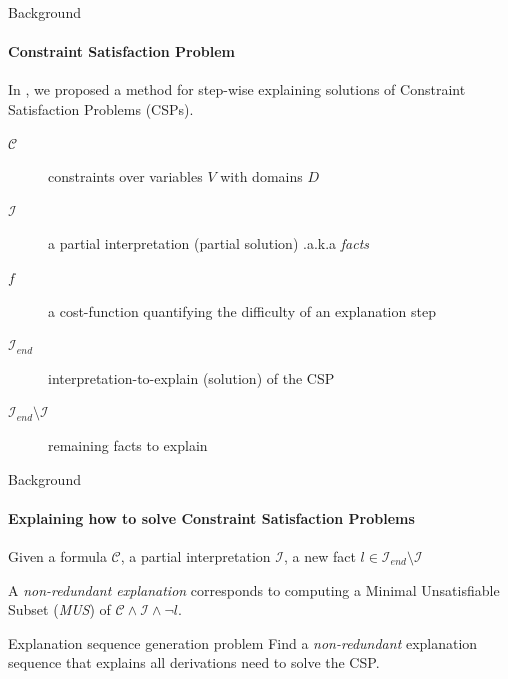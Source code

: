 \documentclass[handout]{beamer}
\newcommand\m[1]{\ensuremath{\mathcal{#1}}\xspace}
\begin{document}
	\begin{frame}{Background}
	\framesubtitle{Constraint Satisfaction Problem}
	In \cite{bogaerts2020step}, we proposed a method for step-wise explaining solutions of Constraint Satisfaction Problems (CSPs).\pause
	\begin{description}
		\item[$\m{C}$] constraints over variables $V$ with domains $D$
		\item[$\m{I}$] a partial interpretation (partial solution) .a.k.a \emph{facts}
		\item[$f$] a cost-function quantifying the difficulty of an explanation step\pause
		\item[$\m{I}_{end}$] interpretation-to-explain (solution) of the CSP \pause  
		\item[$\m{I}_{end} \setminus \m{I}$] remaining facts to explain
	\end{description} \pause

	\end{frame}

	\begin{frame}{Background}
	\framesubtitle{Explaining how to solve Constraint Satisfaction Problems}
		Given a formula $\m{C}$, a partial interpretation $\m{I}$, a new fact $l \in {\m{I}_{end} \setminus \m{I}}$ 
		\begin{definition}
			A \emph{\color{vuborange}non-redundant explanation} corresponds to computing a Minimal Unsatisfiable Subset (\emph{MUS}) of $\m{C} \wedge \m{I} \wedge \lnot l$.
		\end{definition}\pause
	
	\begin{block}{Explanation sequence generation problem}
		Find a \emph{non-redundant} explanation sequence that explains all derivations need to solve the CSP.
	\end{block}\pause
	\end{frame}
\end{document}
